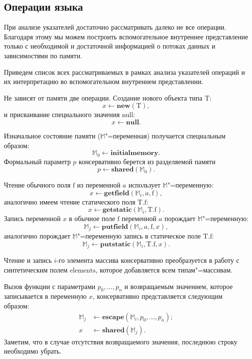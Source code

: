\documentclass[14pt,titlepage,draft]{extarticle}
\newcommand{\java}{\eng{Java}\xspace}
\newcommand{\M}{\ensuremath{\mathbb{M}}}
\newcommand{\type}[1]{\mathrm{#1}}
\newcommand{\field}[1]{\mathrm{#1}}
\newcommand{\sfield}[2]{\type{#1}.\field{#2}}
\newcommand{\op}[1]{\mathbf{#1}}
\begin{document}
  \subsection{Операции языка \texorpdfstring{\java}{Java}}

    При анализе указателей достаточно рассматривать далеко не все операции.
    Благодаря этому мы можем построить вспомогательное внутреннее
    представление только с необходимой и достаточной информацией о потоках
    данных и зависимостями по памяти.

    Приведем список всех рассматриваемых в рамках анализа указателей операций
    и их интерпретацию во вспомогательном внутреннем представлении.

    Не зависят от памяти две операции. Создание нового объекта типа
    $\type{T}$:
    \[ x \gets \op{new}(\type{T}), \]
    и присваивание специального значения null:
    \[ x \gets \op{null}. \]

    Изначальное состояние памяти (\M"=переменная) получается специальным
    образом:
    \[ \M_0 \gets \op{initialmemory}. \]
    Формальный параметр $p$ консервативно берется из разделяемой памяти
    \[ p \gets \op{shared}(\M_0). \]

    Чтение обычного поля $\field{f}$ из переменной $a$ использует
    \M"=переменную:
    \[ x \gets \op{getfield}(\M_i, a, \field{f}), \]
    аналогично имеем чтение статического поля $\sfield{T}{f}$:
    \[ x \gets \op{getstatic}(\M_i, \sfield{T}{f}). \]
    Запись переменной $x$ в обычное поле $\field{f}$ переменной $a$ порождает
    \M"=переменную:
    \[ \M_j \gets \op{putfield}(\M_i, a, \field{f}, x), \]
    аналогично порождает \M"=переменную запись в статическое поле
    $\sfield{T}{f}$:
    \[ \M_j \gets \op{putstatic}(\M_i, \sfield{T}{f}, x). \]

    Чтение и запись $i$-го элемента массива консервативно преобразуется в
    работу с синтетическим полем $\field{elements}$, которое добавляется всем
    типам"=массивам.

    Вызов функции с параметрами $p_0, \ldots, p_n$ и возвращаемым значением,
    которое записывается в переменную $x$, консервативно представляется
    следующим образом:
    \[\begin{aligned}
      \M_j &\gets \op{escape}(\M_i, p_0, \ldots, p_n); \\
      x    &\gets \op{shared}(\M_j).
    \end{aligned}\]
    Заметим, что в случае отсутствия возвращаемого значения, последнюю строку
    необходимо убрать.
\end{document}
